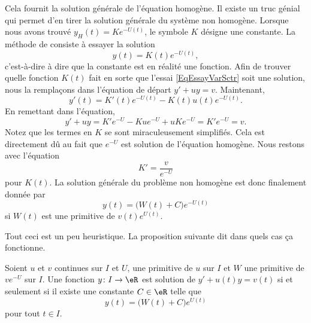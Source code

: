 Cela fournit la solution générale de l'équation homogène. Il existe un truc génial qui permet d'en tirer la solution générale du système non homogène. Lorsque nous avons trouvé \( y_H(t)=K e^{-U(t)}\), le symbole \( K\) désigne une constante. La méthode de  consiste à essayer la solution
\begin{equation}		\label{EqEssayVarSctr}
	y(t)=K(t) e^{-U(t)},
\end{equation}
c'est-à-dire à dire que la constante est en réalité une fonction. Afin de trouver quelle fonction \( K(t)\) fait en sorte que l'essai \eqref{EqEssayVarSctr} soit une solution, nous la remplaçons dans l'équation de départ \( y'+uy=v\). Maintenant,
\begin{equation}
	y'(t)=K'(t) e^{-U(t)}-K(t)u(t) e^{-U(t)}.
\end{equation}
En remettant dans l'équation,
\begin{equation}
	y'+uy=K' e^{-U}-Ku e^{-U}+uK e^{-U}=K' e^{-U}=v.
\end{equation}
Notez que les termes en \( K\) se sont miraculeusement simplifiés. Cela est directement dû au fait que \(  e^{-U}\) est solution de l'équation homogène. Nous restons avec l'équation
\begin{equation}
	K'=\frac{ v }{  e^{-U} }
\end{equation}
pour \( K(t)\). La solution générale du problème non homogène est donc finalement donnée par
\begin{equation}
	y(t)=\big( W(t)+C \big) e^{-U(t)}
\end{equation}
si \( W(t)\) est une primitive de \( v(t)e^{U(t)}\).

Tout ceci est un peu heuristique. La proposition suivante dit dans quels cas ça fonctionne.
\begin{proposition}     \label{PROPooZCXQooPQpkdQ}
	Soient \( u\) et \( v\) continues sur \( I\) et \( U\), une primitive de \( u\) sur \( I\) et \( W\) une primitive de \( v e^{-U}\) sur \( I\). Une fonction \( y\colon I\to \eR\) est solution de \( y'+u(t)y=v(t)\) si et seulement si il existe une constante \( C\in \eR\) telle que
	\begin{equation}
		y(t)=\big( W(t)+C \big) e^{U(t)}
	\end{equation}
	pour tout \( t\in I\).
\end{proposition}

